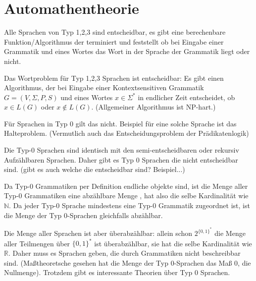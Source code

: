 \documentclass{scrartcl}
\begin{document}
\section{Automathentheorie}

\begin{remark}
Alle Sprachen von Typ 1,2,3 sind entscheidbar,
es gibt eine berechenbare Funktion/Algorithmus der terminiert und 
feststellt ob bei Eingabe einer Grammatik und eines Wortes das Wort 
in der Sprache der Grammatik liegt oder nicht. 
\end{remark}

\begin{theorem}
Das Wortproblem für Typ 1,2,3 Sprachen ist entscheidbar:
Es gibt einen Algorithmus, der bei Eingabe einer Kontextsensitiven Grammatik
$G = (V,Σ,P,S)$ und eines Wortes $x ∈ Σ^*$ in endlicher Zeit entscheidet,
ob $x ∈ L(G)$ oder $x ∉ L(G)$.
(Allgemeiner Algorithmus ist NP-hart.)
\end{theorem}

\begin{remark}
Für Sprachen in Typ 0 gilt das nicht.
Beispiel für eine solche Sprache ist das Halteproblem.
(Vermutlich auch das Entscheidungsproblem der Prädikatenlogik)

Die Typ-0 Sprachen sind identisch mit den semi-entscheidbaren oder
rekursiv Aufzählbaren Sprachen.
Daher gibt es Typ 0 Sprachen die nicht entscheidbar sind.
(gibt es auch welche die entscheidbar sind? Beispiel...)
\end{remark}

\begin{remark}
Da Typ-0 Grammatiken per Definition endliche objekte sind, ist die Menge
aller Typ-0 Grammatiken eine abzählbare Menge \autocite[12]{TIKG:2003},
hat also die selbe Kardinalität wie $ℕ$.
Da jeder Typ-0 Sprache mindestens eine Typ-0 Grammatik zugeordnet ist,
ist die Menge der Typ 0-Sprachen gleichfalls abzählbar.

Die Menge aller Sprachen ist aber überabzählbar:
allein schon $2^{\{0,1\}^*}$ die Menge aller Teilmengen über $\{0,1\}^*$ 
ist überabzählbar, sie hat die selbe Kardinalität wie $ℝ$.
Daher muss es Sprachen geben, die durch Grammatiken nicht beschreibbar sind.
(Maßtheoretsche gesehen hat die Menge der Typ 0-Sprachen das Maß 0,
die Nullmenge). Trotzdem gibt es interessante Theorien über Typ 0 Sprachen.
\end{remark}
\end{document}
